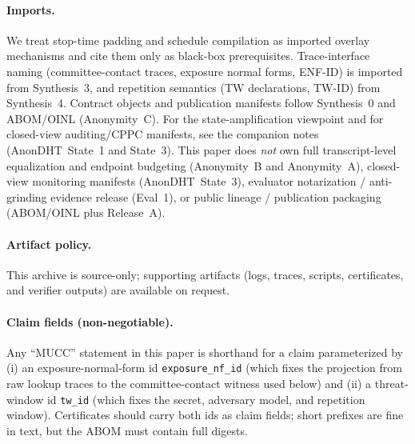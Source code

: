\documentclass[11pt]{article}
\begin{document}
\paragraph{Imports.}
We treat stop-time padding and schedule compilation as imported overlay mechanisms and cite them only as black-box prerequisites.\cite{series:stoptimeaddendum,series:schedcompiler}
Trace-interface naming (committee-contact traces, exposure normal forms, ENF-ID) is imported from Synthesis~3, and repetition semantics (TW declarations, TW-ID) from Synthesis~4.\cite{series:traceifaces,series:threatwindows}
Contract objects and publication manifests follow Synthesis~0 and ABOM/OINL (Anonymity~C).\cite{series:contractobjects,series:abomoinl}
For the state-amplification viewpoint and for closed-view auditing/CPPC manifests, see the companion notes (AnonDHT~State~1 and State~3).\cite{series:state1,series:state3}
This paper does \emph{not} own full transcript-level equalization and endpoint budgeting (Anonymity~B and Anonymity~A), closed-view monitoring manifests (AnonDHT~State~3), evaluator notarization / anti-grinding evidence release (Eval~1), or public lineage / publication packaging (ABOM/OINL plus Release~A).\cite{series:profiling,series:oddsinflation,series:state3,series:evalnotary,series:abomoinl,series:release}

\paragraph{Artifact policy.}
This archive is source-only; supporting artifacts (logs, traces, scripts, certificates, and verifier outputs) are available on request.\cite{series:artifactpolicy}

\paragraph{Claim fields (non-negotiable).}
Any ``MUCC'' statement in this paper is shorthand for a claim parameterized by
(i) an exposure-normal-form id \texttt{exposure\_nf\_id} (which fixes the projection from raw lookup traces to the committee-contact witness used below) and
(ii) a threat-window id \texttt{tw\_id} (which fixes the secret, adversary model, and repetition window).
Certificates should carry both ids as claim fields; short prefixes are fine in text, but the ABOM must contain full digests.
\end{document}
